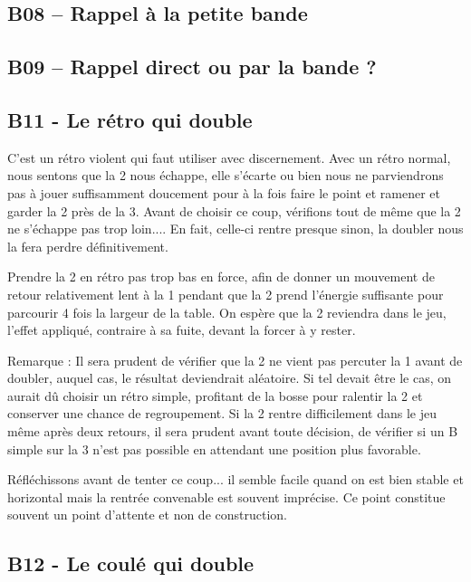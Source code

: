 \subsection{B08 -- Rappel à la petite bande}\label{b08-rappel-uxe0-la-petite-bande}



\subsection{B09 -- Rappel direct ou par la bande
?}\label{b09-rappel-direct-ou-par-la-bande}



\subsection{B11 - Le rétro qui double
}\label{b11---le-ruxe9tro-qui-double}

C'est un rétro violent qui faut utiliser avec discernement. Avec un
rétro normal, nous sentons que la 2 nous échappe, elle s'écarte ou bien
nous ne parviendrons pas à jouer suffisamment doucement pour à la fois
faire le point et ramener et garder la 2 près de la 3. Avant de choisir
ce coup, vérifions tout de même que la 2 ne s'échappe pas trop loin....
En fait, celle-ci rentre presque sinon, la doubler nous la fera perdre
définitivement.

Prendre la 2 en rétro pas trop bas en force, afin de donner un mouvement
de retour relativement lent à la 1 pendant que la 2 prend l'énergie
suffisante pour parcourir 4 fois la largeur de la table. On espère que
la 2 reviendra dans le jeu, l'effet appliqué, contraire à sa fuite,
devant la forcer à y rester.

Remarque : Il sera prudent de vérifier que la 2 ne vient pas percuter la
1 avant de doubler, auquel cas, le résultat deviendrait aléatoire. Si
tel devait être le cas, on aurait dû choisir un rétro simple, profitant
de la bosse pour ralentir la 2 et conserver une chance de regroupement.
Si la 2 rentre difficilement dans le jeu même après deux retours, il
sera prudent avant toute décision, de vérifier si un B simple sur la 3
n'est pas possible en attendant une position plus favorable.

Réfléchissons avant de tenter ce coup... il semble facile quand on est
bien stable et horizontal mais la rentrée convenable est souvent
imprécise. Ce point constitue souvent un point d'attente et non de
construction.

\subsection{B12 - Le coulé qui
double}\label{b12---le-couluxe9-qui-double}

